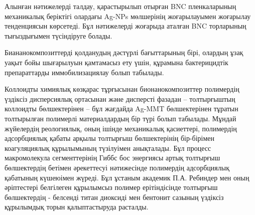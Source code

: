 
Алынған нәтижелерді талдау, қарастырылып отырған BNC пленкаларының
механикалық беріктігі олардағы Ag-NPs мөлшерінің жоғарылауымен жоғарылау
тенденциясын көрсетеді. Бұл нәтижелерді жоғарыда аталған BNC торларының
тығыздығымен түсіндіруге болады.

Биананокомпозиттерді қолданудың дәстүрлі бағыттарының бірі, олардың ұзақ
уақыт бойы шығарылуын қамтамасыз ету үшін, құрамына бактерицидтік
препараттарды иммобилизациялау болып табылады.

Коллоидты химиялық көзқарас тұрғысынан бионанокомпозиттер полимердің
үздіксіз дисперсиялық ортасынан және дисперсті фазадан -- толтырғыштың
коллоидты бөлшектерінен -- бұл жағдайда Ag-MMT бөлшектерінен тұратын
толтырылған полимерлі материалдардың бір түрі болып табылады. Мұндай
жүйелердің реологиялық, оның ішінде механикалық қасиеттері, полимердің
адсорбциялық қабаты арқылы толтырғыш бөлшектерінің бір-бірімен
коагуляциялық құрылымының түзілуімен анықталады. Бұл процесс
макромолекула сегменттерінің Гиббс бос энергиясы артық толтырғыш
бөлшектердің бетімен әрекеттесуі нәтижесінде полимердің адсорбциялық
қабатының күшеюімен жүреді. Бұл ұстаным академик П.А. Ребиндер мен оның
әріптестері белгілеген құрылымсыз полимер ерітіндісінде толтырғыш
бөлшектердің - белсенді титан диоксиді мен бентонит сазының үздіксіз
құрылымдық торын қалыптастыруда расталды.

